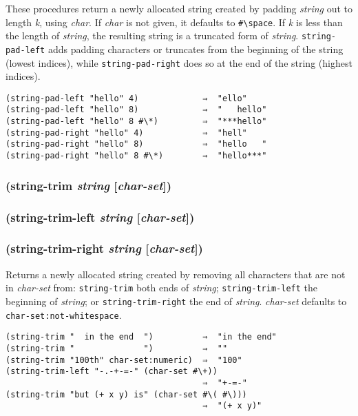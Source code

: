 \documentclass{article}
\begin{document}
These procedures return a newly allocated string created by padding \emph{string} out to
length \emph{k}, using \emph{char}. If \emph{char} is not given, it defaults to
\verb|#\space|. If \emph{k} is less than the length of \emph{string}, the
resulting string is a truncated form of \emph{string}. \verb|string-pad-left| adds padding
characters or truncates from the beginning of the string (lowest indices), while
\verb|string-pad-right| does so at the end of the string (highest indices).

\begin{verbatim}
(string-pad-left "hello" 4)             ⇒  "ello"
(string-pad-left "hello" 8)             ⇒  "   hello"
(string-pad-left "hello" 8 #\*)         ⇒  "***hello"
(string-pad-right "hello" 4)            ⇒  "hell"
(string-pad-right "hello" 8)            ⇒  "hello   "
(string-pad-right "hello" 8 #\*)        ⇒  "hello***"
\end{verbatim}

\subsubsection{(string-trim \emph{string} [\emph{char-set}])}

\subsubsection{(string-trim-left \emph{string} [\emph{char-set}])}

\subsubsection{(string-trim-right \emph{string} [\emph{char-set}])}

Returns a newly allocated string created by removing all characters that are not in
\emph{char-set} from: \verb|string-trim| both ends of \emph{string};
\verb|string-trim-left| the beginning of \emph{string}; or \verb|string-trim-right| the
end of \emph{string}. \emph{char-set} defaults to \verb|char-set:not-whitespace|.

\begin{verbatim}
(string-trim "  in the end  ")          ⇒  "in the end"
(string-trim "              ")          ⇒  ""
(string-trim "100th" char-set:numeric)  ⇒  "100"
(string-trim-left "-.-+-=-" (char-set #\+))
                                        ⇒  "+-=-"
(string-trim "but (+ x y) is" (char-set #\( #\)))
                                        ⇒  "(+ x y)"
\end{verbatim}
\end{document}

